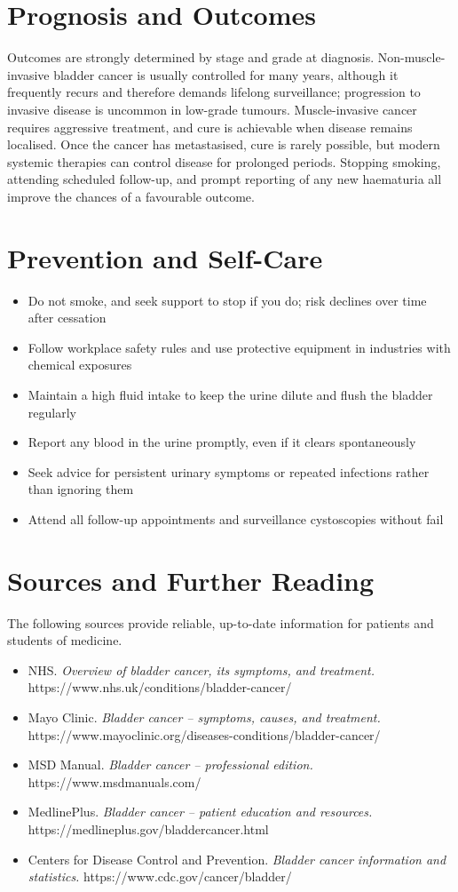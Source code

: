 \section*{Prognosis and Outcomes}
Outcomes are strongly determined by stage and grade at diagnosis. Non-muscle-invasive bladder cancer is usually controlled for many years, although it frequently recurs and therefore demands lifelong surveillance; progression to invasive disease is uncommon in low-grade tumours. Muscle-invasive cancer requires aggressive treatment, and cure is achievable when disease remains localised. Once the cancer has metastasised, cure is rarely possible, but modern systemic therapies can control disease for prolonged periods. Stopping smoking, attending scheduled follow-up, and prompt reporting of any new haematuria all improve the chances of a favourable outcome.

\section*{Prevention and Self-Care}
\begin{itemize}
    \item Do not smoke, and seek support to stop if you do; risk declines over time after cessation
    \item Follow workplace safety rules and use protective equipment in industries with chemical exposures
    \item Maintain a high fluid intake to keep the urine dilute and flush the bladder regularly
    \item Report any blood in the urine promptly, even if it clears spontaneously
    \item Seek advice for persistent urinary symptoms or repeated infections rather than ignoring them
    \item Attend all follow-up appointments and surveillance cystoscopies without fail
\end{itemize}

\section*{Sources and Further Reading}
The following sources provide reliable, up-to-date information for patients and students of medicine.

\begin{itemize}
    \item NHS. \textit{Overview of bladder cancer, its symptoms, and treatment.} https://www.nhs.uk/conditions/bladder-cancer/
    \item Mayo Clinic. \textit{Bladder cancer -- symptoms, causes, and treatment.} https://www.mayoclinic.org/diseases-conditions/bladder-cancer/
    \item MSD Manual. \textit{Bladder cancer -- professional edition.} https://www.msdmanuals.com/
    \item MedlinePlus. \textit{Bladder cancer -- patient education and resources.} https://medlineplus.gov/bladdercancer.html
    \item Centers for Disease Control and Prevention. \textit{Bladder cancer information and statistics.} https://www.cdc.gov/cancer/bladder/
\end{itemize}
